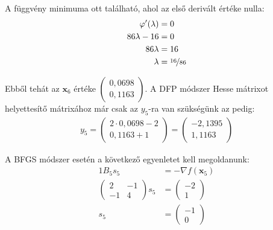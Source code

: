 \begin{megoldas}
A függvény minimuma ott található, ahol az első derivált értéke nulla:
\begin{alignat*}{1}
\varphi'(\lambda)&=0\\
86\lambda-16&=0\\
86\lambda&=16\\
\lambda&=\nicefrac{16}{86}
\end{alignat*}

Ebből tehát az $\mathbf{x}_6$ értéke $\left(\begin{smallmatrix}0,0698\\0,1163\end{smallmatrix}\right)$. A DFP módszer Hesse mátrixot helyettesítő mátrixához már csak az $y_5$-ra van szükségünk az pedig:
\begin{gather*}
y_5=\left(\begin{array}{c}2\cdot 0,0698-2\\0,1163+1\end{array}\right)=\left(\begin{array}{c}-2,1395\\1,1163\end{array}\right)
\end{gather*}

A BFGS módszer esetén a következő egyenletet kell megoldanunk:
\begin{alignat*}{1}
B_5s_5&=-\nabla f(\mathbf{x}_5)\\
\left(\begin{array}{cc}2&-1\\-1&4\end{array}\right)s_5&=\left(\begin{array}{c}-2\\1\end{array}\right)\\
s_5&=\left(\begin{array}{c}-1\\0\end{array}\right)
\end{alignat*}


\end{megoldas}
